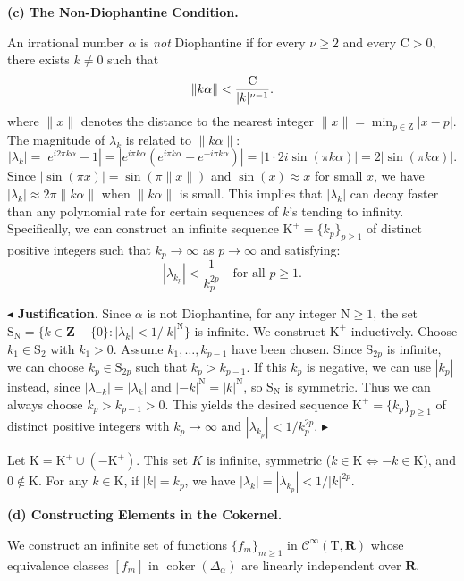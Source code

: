 \documentclass[10pt,letterpaper,reqno]{amsart}
\theoremstyle{article}
\newcommand{\1}{{\hat 1}}
\newcommand{\0}{{\hat 0}}
\newcommand{\RR}{\mathbf R}
\newcommand{\ZZ}{\mathbf Z}
\def \C{\mathrm C}
\def \K{\mathrm K}
\def \N{\mathrm N}
\def \S{\mathrm S}
\def \T{\mathrm T}
\def \Z{\mathrm Z}
\renewcommand{\over}{\above .2pt}
\newcommand{\coker}{\operatorname{coker}}
\newcommand{\Cinfty}{\mathcal{C}^\infty}
\begin{document}
    \textbf{(c) The Non-Diophantine Condition.}
    
    An irrational number $\alpha$ is \emph{not} Diophantine if for every $\nu \ge 2$ and every $\C > 0$,
    there exists $k \neq 0$ such that
    $$
      \|k\alpha\| < {\C \over |k|^{\nu-1}}.
      $$
    where $\|x\|$ denotes the distance to the nearest integer $\|x\| = \min_{p\in\Z} |x - p|$.
    The magnitude of $\lambda_k$ is related to $\|k\alpha\|$:
    $$
      |\lambda_k| = |e^{i2\pi k \alpha} - 1| = |e^{i\pi k \alpha}(e^{i\pi k \alpha} - e^{-i\pi k \alpha})| = |1 \cdot 2i \sin(\pi k \alpha)| = 2 |\sin(\pi k \alpha)|.
      $$
    Since $|\sin(\pi x)| = \sin(\pi \|x\|)$ and $\sin(x) \approx x$ for small $x$,
    we have $|\lambda_k| \approx 2\pi \|k\alpha\|$ when $\|k\alpha\|$ is small.
    This implies that $|\lambda_k|$ can decay faster than any polynomial rate for certain sequences of $k$'s tending to infinity.
    Specifically,
    we can construct an infinite sequence $\K^+ = \{k_p\}_{p \ge 1}$ of distinct positive integers such that $k_p \to \infty$ as $p \to \infty$ and satisfying:
    $$
      |\lambda_{k_p}| < \frac{1}{k_p^{2p}} \quad \text{for all } p \ge 1.
      $$
    
    $\blacktriangleleft$ \textbf{Justification}.
    Since $\alpha$ is not Diophantine,
    for any integer $\N \ge 1$,
    the set $\S_\N = \{ k \in \ZZ - \{0\} : |\lambda_k| < 1/|k|^\N \}$ is infinite.
    We construct $\K^+$ inductively.
    Choose $k_1 \in \S_2$ with $k_1 > 0$.
    Assume $k_1, \dots, k_{p-1}$ have been chosen.
    Since $\S_{2p}$ is infinite,
    we can choose $k_p \in \S_{2p}$ such that $k_p > k_{p-1}$.
    If this $k_p$ is negative,
    we can use $|k_p|$ instead,
    since $|\lambda_{-k}| = |\lambda_k|$ and $|-k|^\N = |k|^\N$,
    so $\S_\N$ is symmetric.
    Thus we can always choose $k_p > k_{p-1} > 0$.
    This yields the desired sequence $\K^+=\{k_p\}_{p \ge 1}$ of distinct positive integers with $k_p \to \infty$ and $|\lambda_{k_p}| < 1/k_p^{2p}$.
    $\blacktriangleright$
    
    Let $\K = \K^+ \cup (-\K^+)$.
    This set $K$ is infinite,
    symmetric ($k \in \K \iff -k \in \K$),
    and $0 \notin \K$.
    For any $k \in \K$,
    if $|k| = k_p$,
    we have $|\lambda_k| = |\lambda_{k_p}| < 1/|k|^{2p}$.
    
    \textbf{(d) Constructing Elements in the Cokernel.}
    
    We construct an infinite set of functions $\{f_m\}_{m\ge 1}$ in $\Cinfty(\T, \RR)$ whose equivalence classes $[f_m]$ in $\coker(\Delta_\alpha)$ are linearly independent over $\RR$.
    
\end{document}
